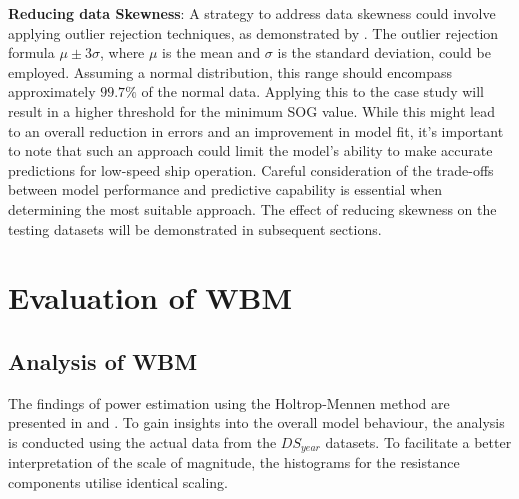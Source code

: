 \textbf{Reducing data Skewness}: A strategy to address data skewness could involve applying outlier rejection techniques, as demonstrated by . The outlier rejection formula $\mu \pm 3\sigma$, where $\mu$ is the mean and $\sigma$ is the standard deviation, could be employed. Assuming a normal distribution, this range should encompass approximately $99.7\%$ of the normal data. Applying this to the case study will result in a higher threshold for the minimum SOG value. While this might lead to an overall reduction in errors and an improvement in model fit, it's important to note that such an approach could limit the model's ability to make accurate predictions for low-speed ship operation. Careful consideration of the trade-offs between model performance and predictive capability is essential when determining the most suitable approach. The effect of reducing skewness on the testing datasets will be demonstrated in subsequent sections.\\

\section{Evaluation of WBM}\label{sec:WBM_perf_eval}

\subsection{Analysis of WBM}\label{sec:Power_estimation_actual}

The findings of power estimation using the Holtrop-Mennen method are presented in  and . To gain insights into the overall model behaviour, the analysis is conducted using the actual data from the $DS_{year}$ datasets. To facilitate a better interpretation of the scale of magnitude, the histograms for the resistance components utilise identical scaling.\\

